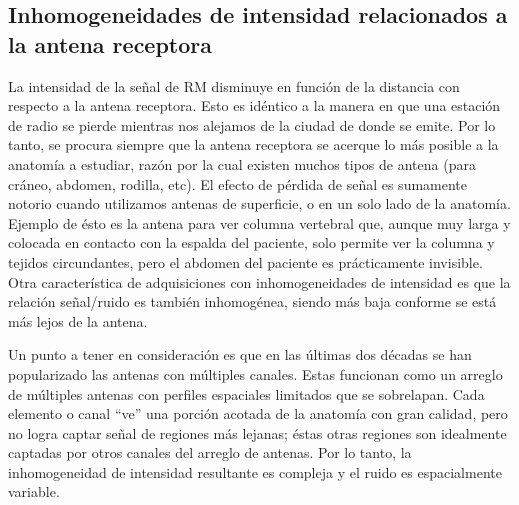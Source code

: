 \subsection{Inhomogeneidades de intensidad relacionados a la antena receptora}
La intensidad de la señal de RM disminuye en función de la distancia con respecto a la antena receptora. Esto es idéntico a la manera en que una estación de radio se pierde mientras nos alejamos de la ciudad de donde se emite. Por lo tanto, se procura siempre que la antena receptora se acerque lo más posible a la anatomía a estudiar, razón por la cual existen muchos tipos de antena (para cráneo,  abdomen,  rodilla, etc). El efecto de pérdida de señal es sumamente notorio cuando utilizamos antenas de superficie, o en un solo lado de la anatomía. Ejemplo de ésto es la antena para ver columna vertebral que, aunque muy larga y colocada en contacto con la espalda del paciente, solo permite ver la columna y tejidos circundantes, pero el abdomen del paciente es prácticamente invisible. Otra característica de adquisiciones con inhomogeneidades de intensidad es que la relación señal/ruido es también inhomogénea, siendo más baja conforme se está más lejos de la antena.

Un punto a tener en consideración es que en las últimas dos décadas se han popularizado las antenas con múltiples canales. Estas funcionan como un arreglo de múltiples antenas con perfiles espaciales limitados que se sobrelapan. Cada elemento o canal ``ve'' una porción acotada de la anatomía con gran calidad, pero no logra captar señal de regiones más lejanas; éstas otras regiones son idealmente captadas por otros canales del arreglo de antenas. Por lo tanto, la inhomogeneidad de intensidad resultante es compleja y el ruido es espacialmente variable.

